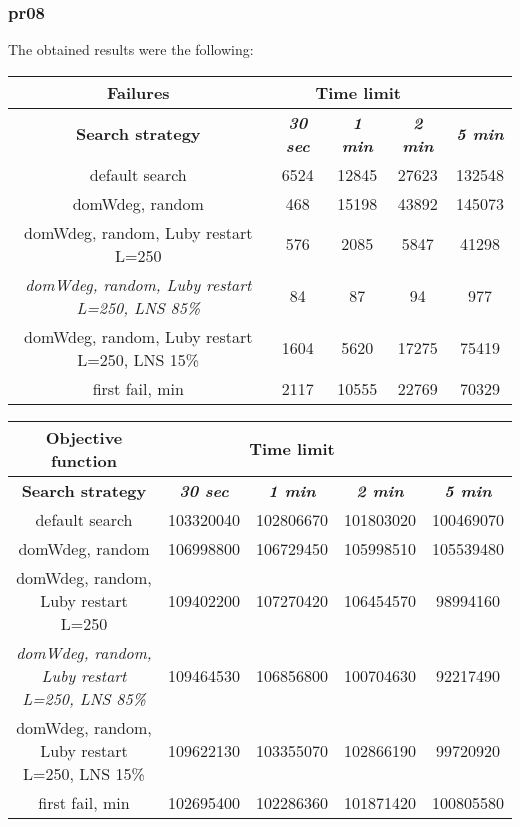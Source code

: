 \subsubsection{pr08}
The obtained results were the following:
{
\renewcommand{\arraystretch}{2}
\begin{longtable}[h]{| c | c | c | c | c |}
    \hline
    \textbf{Failures} & \multicolumn{3}{c}{Time limit} & \\
    \hline
    \textbf{Search strategy} & \textbf{\textit{30 sec}} & \textbf{\textit{1 min}} & \textbf{\textit{2 min}} & \textbf{\textit{5 min}} \\
    \hline
    \endhead
    default search                                         & 6524 & 12845 &  27623 & 132548 \\
    \hline
    domWdeg, random                                        &  468 & 15198 &  43892 & 145073 \\
    \hline
    domWdeg, random, Luby restart L=250                    &  576 &  2085 &   5847 &  41298 \\
    \hline
    \textit{domWdeg, random, Luby restart L=250, LNS 85\%} &   84 &    87 &     94 &    977 \\
    \hline
    domWdeg, random, Luby restart L=250, LNS 15\%          & 1604 &  5620 &  17275 &  75419 \\
    \hline
    first fail, min                                        & 2117 & 10555 &  22769 &  70329 \\
    \hline
\end{longtable}
}

{
\renewcommand{\arraystretch}{2}
\begin{longtable}[h]{| c | c | c | c | c |}
    \hline
    \textbf{Objective function} & \multicolumn{3}{c}{Time limit} & \\
    \hline
    \textbf{Search strategy} & \textbf{\textit{30 sec}} & \textbf{\textit{1 min}} & \textbf{\textit{2 min}} & \textbf{\textit{5 min}} \\
    \hline
    \endhead
    default search                                         & 103320040 & 102806670 & 101803020 & 100469070 \\
    \hline
    domWdeg, random                                        & 106998800 & 106729450 & 105998510 & 105539480 \\
    \hline
    domWdeg, random, Luby restart L=250                    & 109402200 & 107270420 & 106454570 &  98994160 \\
    \hline
    \textit{domWdeg, random, Luby restart L=250, LNS 85\%} & 109464530 & 106856800 & 100704630 &  92217490 \\
    \hline
    domWdeg, random, Luby restart L=250, LNS 15\%          & 109622130 & 103355070 & 102866190 &  99720920 \\
    \hline
    first fail, min                                        & 102695400 & 102286360 & 101871420 & 100805580 \\
    \hline
\end{longtable}
}